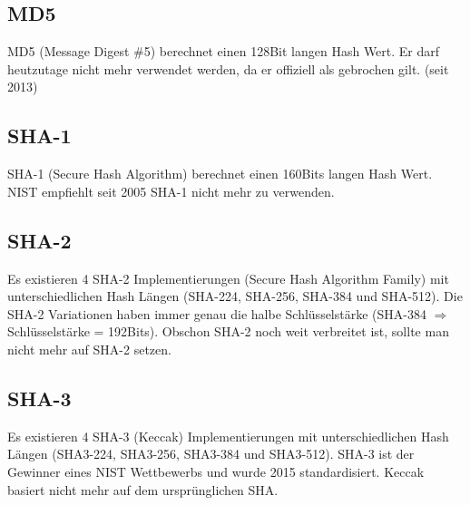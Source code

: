 \subsection{MD5}
MD5 (Message Digest \#5) berechnet einen 128Bit langen Hash Wert. Er darf heutzutage nicht mehr verwendet werden, da er offiziell als gebrochen gilt. (seit 2013)

\subsection{SHA-1 }
SHA-1 (Secure Hash Algorithm) berechnet einen 160Bits langen Hash Wert. NIST empfiehlt seit 2005 SHA-1 nicht mehr zu verwenden. 

\subsection{SHA-2}
Es existieren 4 SHA-2 Implementierungen (Secure Hash Algorithm Family) mit unterschiedlichen Hash Längen (SHA-224, SHA-256, SHA-384 und SHA-512). Die SHA-2 Variationen haben immer genau die halbe Schlüsselstärke (SHA-384 $\Rightarrow$ Schlüsselstärke = 192Bits). Obschon SHA-2 noch weit verbreitet ist, sollte man nicht mehr auf SHA-2 setzen.


\subsection{SHA-3}
Es existieren 4 SHA-3 (Keccak) Implementierungen mit unterschiedlichen Hash Längen (SHA3-224, SHA3-256, SHA3-384 und SHA3-512). SHA-3 ist der Gewinner eines NIST Wettbewerbs und wurde 2015 standardisiert. Keccak basiert nicht mehr auf dem ursprünglichen SHA.


